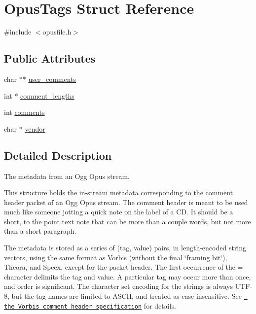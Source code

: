 \hypertarget{struct_opus_tags}{}\section{Opus\+Tags Struct Reference}
\label{struct_opus_tags}


{\ttfamily \#include $<$opusfile.\+h$>$}

\subsection*{Public Attributes}
\begin{DoxyCompactItemize}
\item 
char $\ast$$\ast$ \mbox{\hyperlink{struct_opus_tags_ad53d571bd8b23691089242e4e161358a}{user\+\_\+comments}}
\item 
int $\ast$ \mbox{\hyperlink{struct_opus_tags_aa99547abb03d7dbe0cd7095d8b706170}{comment\+\_\+lengths}}
\item 
int \mbox{\hyperlink{struct_opus_tags_a65c37166930a1f5d682fa6c863fc28c6}{comments}}
\item 
char $\ast$ \mbox{\hyperlink{struct_opus_tags_af6ff133dfd801934d981bc5905dae0bd}{vendor}}
\end{DoxyCompactItemize}


\subsection{Detailed Description}
The metadata from an Ogg Opus stream.

This structure holds the in-\/stream metadata corresponding to the \textquotesingle{}comment\textquotesingle{} header packet of an Ogg Opus stream. The comment header is meant to be used much like someone jotting a quick note on the label of a CD. It should be a short, to the point text note that can be more than a couple words, but not more than a short paragraph.

The metadata is stored as a series of (tag, value) pairs, in length-\/encoded string vectors, using the same format as Vorbis (without the final \char`\"{}framing
 bit\char`\"{}), Theora, and Speex, except for the packet header. The first occurrence of the \textquotesingle{}=\textquotesingle{} character delimits the tag and value. A particular tag may occur more than once, and order is significant. The character set encoding for the strings is always U\+T\+F-\/8, but the tag names are limited to A\+S\+C\+II, and treated as case-\/insensitive. See \href{http://www.xiph.org/vorbis/doc/v-comment.html}{\texttt{ the Vorbis comment header specification}} for details.

